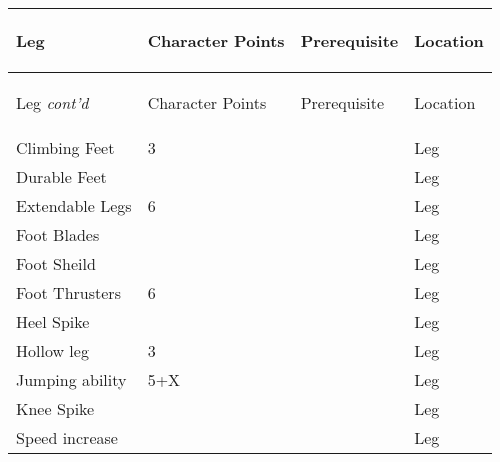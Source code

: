 \documentclass[twoside]{book}
\begin{document}
\begin{longtable}{p{1.25in}p{2em}ll} 
  Leg& \begin{turn}{70}{Character Points}\end{turn}
          & \begin{turn}{70}{Prerequisite}\end{turn}
          & \begin{turn}{70}{Location}\end{turn}
          \\
  \hline
  \hline
  \endfirsthead
  Leg \textit{cont'd}
        & \begin{turn}{70}{Character Points}\end{turn}
          & \begin{turn}{70}{Prerequisite}\end{turn}
          & \begin{turn}{70}{Location}\end{turn}
           \\
  \hline
  \endhead
\raggedright  Climbing Feet& 3&& Leg\tabularnewline
      \raggedright  Durable Feet&&& Leg\tabularnewline
      \raggedright  Extendable Legs& 6&& Leg\tabularnewline
      \raggedright  Foot Blades&&& Leg\tabularnewline
      \raggedright  Foot Sheild&&& Leg\tabularnewline
      \raggedright  Foot Thrusters& 6&& Leg\tabularnewline
      \raggedright  Heel Spike&&& Leg\tabularnewline
      \raggedright  Hollow leg& 3&& Leg\tabularnewline
      \raggedright  Jumping ability& 5+X&& Leg\tabularnewline
      \raggedright  Knee Spike&&& Leg\tabularnewline
      \raggedright  Speed increase&&& Leg\tabularnewline
      
\end{longtable}
    
\end{document}
